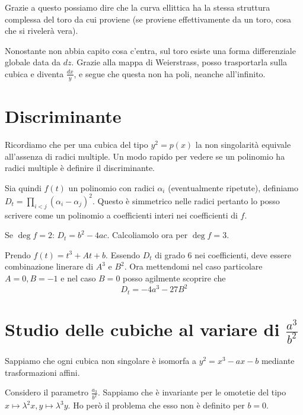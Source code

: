 	Grazie a questo possiamo dire che la curva ellittica ha la stessa struttura complessa del toro da cui proviene (se proviene effettivamente da un toro, cosa che si rivelerà vera).

	\begin{osservazione}
		Nonostante non abbia capito cosa c'entra, sul toro esiste una forma differenziale globale data da $dz$. Grazie alla mappa di Weierstrass, posso trasportarla sulla cubica e diventa $\frac{dx}y$, e segue che questa non ha poli, neanche all'infinito.

	\end{osservazione}


	\section{Discriminante}

	Ricordiamo che per una cubica del tipo $y^2=p(x)$ la non singolarità equivale all'assenza di radici multiple. Un modo rapido per vedere se un polinomio ha radici multiple è definire il discriminante.

	Sia quindi $f(t)$ un polinomio con radici $\alpha_i$ (eventualmente ripetute), definiamo $D_t=\prod_{i<j} (\alpha_i - \alpha_j)^2$. Questo è simmetrico nelle radici pertanto lo posso scrivere come un polinomio a coefficienti interi nei coefficienti di $f$.

	Se $\deg f=2$: $D_t= b^2-4ac$. Calcoliamolo ora per $\deg f=3$.

	Prendo $f(t)=t^3+At+b$. Essendo $D_t$ di grado 6 nei coefficienti, deve essere combinazione linerare di $A^3$ e $B^2$. Ora mettendomi nel caso particolare $A=0,B=-1$ e nel caso $B=0$ posso agilmente scoprire che
	\[
		D_t=-4a^3-27B^2
	\]

	\section{Studio delle cubiche al variare di $\frac{a^3}{b^2}$}

	Sappiamo che ogni cubica non singolare è isomorfa a $y^2=x^3-ax-b$ mediante trasformazioni affini.

	Considero il parametro $\frac{a_3}{b^2}$. Sappiamo che è invariante per le omotetie del tipo $x\mapsto \lambda^2x, y\mapsto\lambda^3y$. Ho però il problema che esso non è definito per $b=0$.

